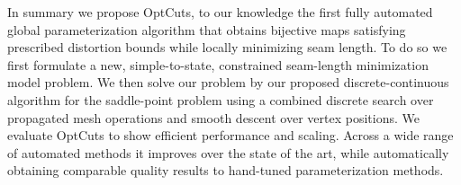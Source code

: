 In summary we propose OptCuts, to our knowledge the first fully automated global parameterization algorithm that obtains bijective maps satisfying prescribed distortion bounds while locally minimizing seam length. To do so we first formulate a new, simple-to-state, constrained seam-length minimization model problem. We then solve our problem by our proposed discrete-continuous algorithm for the saddle-point problem using a combined discrete search over propagated mesh operations and smooth descent over vertex positions. We evaluate OptCuts to show efficient performance and scaling. Across a wide range of automated methods it improves over the state of the art, while automatically obtaining comparable quality results to hand-tuned parameterization methods. 
